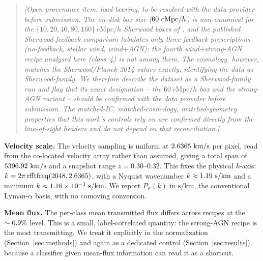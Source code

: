 \begin{quote}\small
\textit{[Open provenance item, load-bearing, to be resolved with the data
provider before submission. The on-disk box size ($60~\mathrm{cMpc}/h$) is
non-canonical for the $\{10,20,40,80,160\}~\mathrm{cMpc}/h$ Sherwood boxes of
\citet{Bolton2017}, and the published Sherwood feedback comparison
\citep{Bolton2017, Nasir2017} tabulates only three feedback prescriptions
(no-feedback, stellar wind, wind${+}$AGN); the fourth wind${+}$strong-AGN
recipe analysed here (class~4) is not among them. The cosmology, however,
matches the Sherwood/Planck-2014 values exactly, identifying the data as
Sherwood-family. We therefore describe the dataset as a Sherwood-family run and
flag that its exact designation -- the $60~\mathrm{cMpc}/h$ box and the
strong-AGN variant -- should be confirmed with the data provider before
submission. The matched-IC, matched-cosmology, matched-geometry properties that
this work's controls rely on are confirmed directly from the line-of-sight
headers and do not depend on that reconciliation.]}
\end{quote}

\textbf{Velocity scale.} The velocity sampling is uniform at $2.6365~\mathrm{km/s}$
per pixel, read from the co-located velocity array rather than assumed, giving a
total span of $5396.92~\mathrm{km/s}$ and a snapshot range $z=0.30$--$0.32$.
This fixes the physical $k$-axis: $k=2\pi\,\mathrm{rfftfreq}(2048, 2.6365)$,
with a Nyquist wavenumber $k\approx1.19~\mathrm{s/km}$ and a minimum
$k\approx1.16\times10^{-3}~\mathrm{s/km}$. We report $P_F(k)$ in $\mathrm{s/km}$, the
conventional Lyman-$\alpha$ basis, with no comoving conversion.

\textbf{Mean flux.} The per-class mean transmitted flux differs across recipes at
the $\sim0.9\%$ level. This is a small, label-correlated quantity: the
strong-AGN recipe is the most transmitting. We treat it explicitly in the
normalization (Section~\ref{sec:methods}) and again as a dedicated control
(Section~\ref{sec:results}), because a classifier given mean-flux information can
read it as a shortcut.

